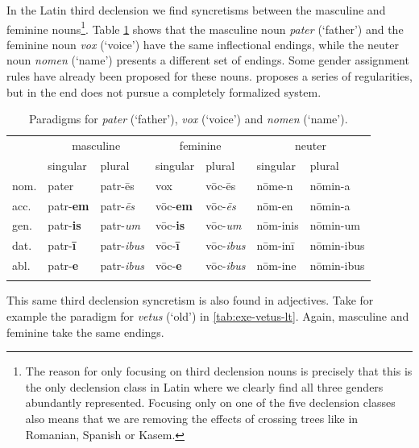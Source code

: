 
In the Latin third declension we find syncretisms between the masculine and feminine nouns\footnote{The reason for only focusing on third declension nouns is precisely that this is the only declension class in Latin where we clearly find all three genders abundantly represented. Focusing only on one of the five declension classes also means that we are removing the effects of crossing trees like in Romanian, Spanish or Kasem.}. Table \ref{tab:paradigm-third-nouns-lat} shows that the masculine noun \textit{pater} (`father') and the feminine noun \textit{vox} (`voice') have the same inflectional endings, while the neuter noun \textit{nomen} (`name') presents a different set of endings. Some gender assignment rules have already been proposed for these nouns. \textcite{Aronoff.1994} proposes a series of regularities, but in the end does not pursue a completely formalized system.

\begin{table}
  \centering
  \begin{tabular}{lllllll}
    \lsptoprule
    & \multicolumn{2}{c}{masculine} & \multicolumn{2}{c}{feminine} & \multicolumn{2}{c}{neuter} \\

         & singular & plural    & singular & plural   & singular & plural     \\
    \midrule
    nom. & pater    & patr-ēs   & vox      & vōc-ēs   & nōme-n    & nōmin-a     \\
    acc. & patr-\textbf{em}  & patr-\textit{ēs}   & vōc-\textbf{em}   & vōc-\textit{ēs}   & nōm-en   & nōmin-a    \\
    gen. & patr-\textbf{is}  & patr-\textit{um}   & vōc-\textbf{is}   & vōc-\textit{um}   & nōm-inis & nōmin-um   \\
    dat. & patr-\textbf{ī}   & patr-\textit{ibus} & vōc-\textbf{ī}    & vōc-\textit{ibus} & nōm-inī  & nōmin-ibus \\
    abl. & patr-\textbf{e}   & patr-\textit{ibus} & vōc-\textbf{e}    & vōc-\textit{ibus} & nōm-ine  & nōmin-ibus \\
    \lspbottomrule
  \end{tabular}\caption{Paradigms for \textit{pater} (`father'), \textit{vox} (`voice') and \textit{nomen} (`name').}\label{tab:paradigm-third-nouns-lat}
\end{table}

This same third declension syncretism is also found in adjectives. Take for example the paradigm for \textit{vetus} (`old') in \ref{tab:exe-vetus-lt}. Again, masculine and feminine take the same endings.


